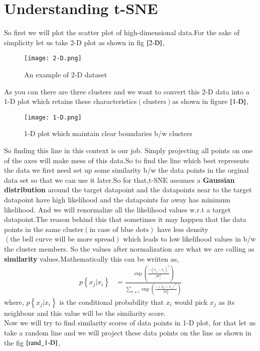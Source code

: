 \documentclass[journal,12pt,onecolumn]{IEEEtran}
\providecommand{\brak}[1]{\ensuremath{\left(#1\right)}}
\providecommand{\cbrak}[1]{\ensuremath{\left\{#1\right\}}}
\theoremstyle{remark}
\numberwithin{equation}{section}
\begin{document}
               \section{Understanding t-SNE}
		  So first we will plot the scatter plot of high-dimensional data.For the sake of simplicity let us take 2-D plot as shown in fig $\ref{2-D}$,
		     \begin{figure}[ht!]
		      \centering
		      \texttt{[image: 2-D.png]}
		      \caption{An example of 2-D dataset}
		      \label{2-D}
	             \end{figure}
		     As you can there are three clusters and we want to convert this 2-D data into a 1-D plot which retains these characteristics$\brak{\text{clusters}}$as shown in figure $\ref{1-D}$,
		     \begin{figure}[ht!]
		      \centering
		      \texttt{[image: 1-D.png]}
		      \caption{1-D plot which maintain clear boundaries b/w clusters}
	              \label{1-D}
	             \end{figure}
	       So finding this line in this context is our job. Simply projecting all points on one of the axes will make mess of this data.So to find the line which best represents the data we first need set up some similarity b/w the data points in the orginal data set so that we can use it later.So for that,t-SNE assumes a \textbf{Gaussian distribution} around the target datapoint and the datapoints near to the target datapoint have high likelihood and the datapoints far away has minimum likelihood. And we will renormalize all the likelihood values w.r.t a target datapoint.The reason behind this that sometimes it may happen that the data points in the same cluster$\brak{\text{in case of blue dots}}$ have less density$\brak{\text{the bell curve will be more spread}}$ which leads to low likelihood values in b/w the cluster members.
	       So the values after normalization are what we are calling as \textbf{similarity} values.Mathematically this can be wriiten as,
	        \begin{align}
			p\cbrak{x_j|x_i} &= \frac{\exp\brak{\frac{-\brak{x_j-x_i}^2}{2\sigma_i^2}}}{\sum_{k\neq i}\exp\brak{\frac{-\brak{x_k-x_i}^2}{2\sigma_k^2}}}\label{eq:1}
	        \end{align}
		  where, $p\cbrak{x_j|x_i}$ is the conditional probability that $x_i$ would pick $x_j$ as its neighbour and this value will be the similarity score.\\
Now we will try to find similarity scores of data points in 1-D plot, for that let us take a random line and we will project these data points on the line as shown in the fig $\ref{rand_1-D}$,
\end{document}
